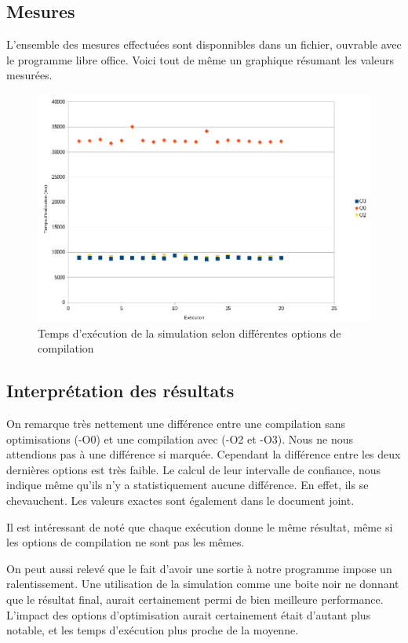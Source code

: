 \documentclass[a4paper, 12pt]{article}
\begin{document}
\subsection{Mesures}
L'ensemble des mesures effectuées sont disponnibles dans un fichier, ouvrable avec le programme libre office. Voici tout de même un graphique résumant les valeurs mesurées.
\begin{figure}[!h]
  \centering
  \caption{Temps d'exécution de la simulation selon différentes options de compilation}
  \includegraphics[width=\textwidth]{img/exec_plot.png}
\end{figure}
\subsection{Interprétation des résultats}
On remarque très nettement une différence entre une compilation sans optimisations (-O0) et une compilation avec (-O2 et -O3).
Nous ne nous attendions pas à une différence si marquée. Cependant la différence entre les deux dernières options est très faible.
Le calcul de leur intervalle de confiance, nous indique même qu'ils n'y a statistiquement aucune différence. En effet, ils se chevauchent.
Les valeurs exactes sont également dans le document joint.

Il est intéressant de noté que chaque exécution donne le même résultat, même si les options de compilation ne sont pas les mêmes.

On peut aussi relevé que le fait d'avoir une sortie à notre programme impose un ralentissement. Une utilisation de la simulation comme une boite noir ne donnant que le résultat final, aurait certainement permi de bien meilleure performance. L'impact des options d'optimisation aurait certainement était d'autant plus notable, et les temps d'exécution plus proche de la moyenne.
\end{document}
